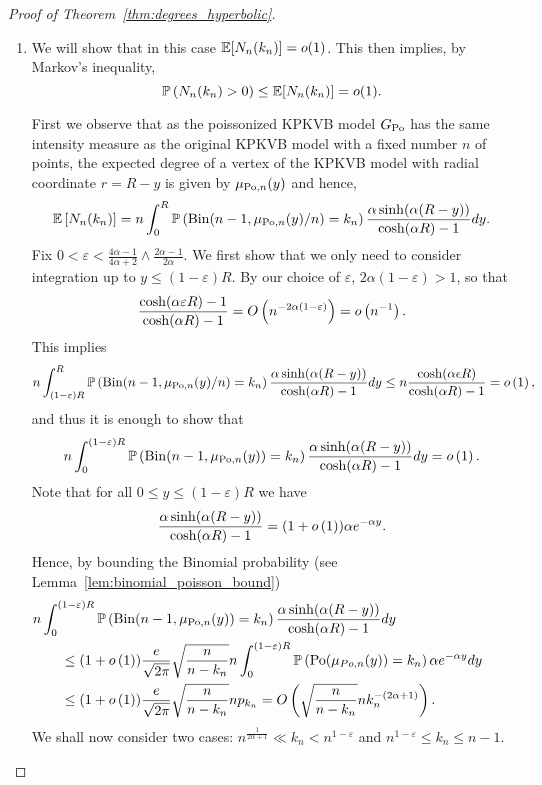 \begin{proof}[Proof of Theorem~\ref{thm:degrees_hyperbolic}]
\begin{enumerate}[\upshape (i)]
Finally, since $k_n = \bigO{n^{\frac{1}{2\alpha+1}}}$, by Lemma~\ref{lem:diff_Nk_hyperbolic_binomial_poisson}, $\Exp{| N_n(k_n) - N_{Po}(k_n)|} = o(\Exp{N_{Po}(k_n)}) = o(\zeta)$, from which it follows that $\Prob{|N_n(k_n)-N_{Po}(k_n)|\geq 1} \leq \Exp{ |N_n(k_n)-N_{Po}(k_n)|} = o(\zeta)$. Hence, it also holds that $N_n(k_n) \xrightarrow{d} Po(\zeta)$.

\item We will show that in this case $\mathbb{E}[N_n(k_n)] = o(1)$. This then implies, by Markov's inequality,
\[
	\mathbb{P}\left(N_n(k_n)>0\right)\leq \mathbb{E}[N_n(k_n)] = o(1).
\]

First we observe that as the poissonized KPKVB model $G_{{\mathrm{Po}}}$ has the same intensity measure as the original KPKVB model with a fixed number $n$ of points, the expected degree of a vertex of the KPKVB model with radial coordinate $r=R-y$ is given by $\mu_{{\mathrm{Po}},n}(y)$ and hence,
\[
	\mathbb{E}\left[N_n(k_n)\right] = n \int_0^R \mathbb{P}\left(\mathrm{Bin}(n-1,\mu_{{\mathrm{Po}},n}(y)/n) = k_n\right) \frac{\alpha \sinh(\alpha (R-y))}{\cosh(\alpha R)-1} dy.
\]
Fix $0 < \varepsilon < \frac{4\alpha - 1}{4\alpha + 2} \wedge \frac{2\alpha - 1}{2\alpha}$. We first show that we only need to consider integration up to $y \le (1-\varepsilon)R$. By our choice of $\varepsilon$, $2\alpha(1-\varepsilon) > 1$, so that
\[
	\frac{\cosh(\alpha \varepsilon R) - 1}{\cosh(\alpha R) - 1}
	= O\left(n^{-2\alpha (1 - \varepsilon)}\right) = o\left(n^{-1}\right).
\]
This implies
\[
	n \int_{(1-\varepsilon)R}^R \mathbb{P}\left(\mathrm{Bin}(n-1,\mu_{{\mathrm{Po}},n}(y)/n) = k_n\right)
	\frac{\alpha \sinh(\alpha (R-y))}{\cosh(\alpha R)-1} dy
	\le n \frac{\cosh(\alpha \epsilon R)}{\cosh(\alpha R)-1} = o\left(1\right),
\]
and thus it is enough to show that
\[
	n \int_0^{(1-\varepsilon)R} \mathbb{P}\left(\mathrm{Bin}(n-1,\mu_{{\mathrm{Po}},n}(y)) = k_n\right)
	\frac{\alpha \sinh(\alpha (R-y))}{\cosh(\alpha R)-1} dy = o\left(1\right).
\]
Note that for all $0 \le y \le (1-\varepsilon)R$ we have
\[
	\frac{\alpha \sinh(\alpha (R-y))}{\cosh(\alpha R)-1} = (1+o\left(1\right)) \alpha e^{-\alpha y}.
\]
Hence, by bounding the Binomial probability (see Lemma~\ref{lem:binomial_poisson_bound})
\begin{align*}
	&\hspace{-20pt} n \int_0^{(1-\varepsilon)R} \Prob{\mathrm{Bin}(n-1,\mu_{\Po,n}(y)) = k_n}
		\frac{\alpha \sinh(\alpha (R-y))}{\cosh(\alpha R)-1} dy\\
	&\le (1+\smallO{1}) \frac{e}{\sqrt{2\pi}} \sqrt{\frac{n}{n-k_n}}
		n \int_0^{(1-\varepsilon)R} \Prob{\Po(\mu_{Po,n}(y)) = k_n} \alpha e^{-\alpha y} dy \\
	&\le (1+\smallO{1}) \frac{e}{\sqrt{2\pi}} \sqrt{\frac{n}{n-k_n}} n p_{k_n}
	= \bigO{\sqrt{\frac{n}{n-k_n}} n k_n^{-(2\alpha + 1)}}.
\end{align*}
We shall now consider two cases: $n^{\frac{1}{2\alpha + 1}} \ll k_n < n^{1-\varepsilon}$ and $n^{1-\varepsilon} \le k_n \le n - 1$.


\end{enumerate}
\end{proof}
